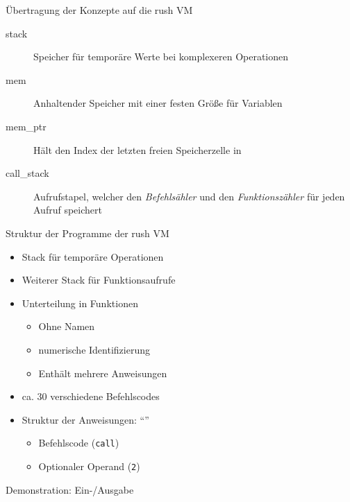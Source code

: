 \begin{frame}{Übertragung der Konzepte auf die rush VM }
	\begin{description}
		\item[stack] Speicher für temporäre Werte bei komplexeren Operationen
		\item[mem] Anhaltender Speicher mit einer festen Größe für Variablen
		\item[mem\_ptr] Hält den Index der letzten freien Speicherzelle in 
		\item[call\_stack] Aufrufstapel, welcher den \emph{Befehlsähler} und den \emph{Funktionszähler} für jeden Aufruf speichert
	\end{description}
\end{frame}

\begin{frame}{Struktur der Programme der rush VM}
	\begin{itemize}
		\item Stack für temporäre Operationen
		\item Weiterer Stack für Funktionsaufrufe
		\item Unterteilung in Funktionen
		      \begin{itemize}
			      \item Ohne Namen
			      \item numerische Identifizierung
			      \item Enthält mehrere Anweisungen
		      \end{itemize}
		\item ca. 30 verschiedene Befehlscodes
		\item Struktur der Anweisungen: \enquote{}
		      \begin{itemize}
			      \item Befehlscode (\texttt{call})
			      \item Optionaler Operand (\texttt{2})
		      \end{itemize}
	\end{itemize}
\end{frame}

\begin{frame}{Demonstration: Ein-/Ausgabe}
	\begin{minipage}{0.5\textwidth}
		\centering
	\end{minipage}
	\hfill
	\begin{minipage}{0.35\textwidth}
	\end{minipage}
\end{frame}

